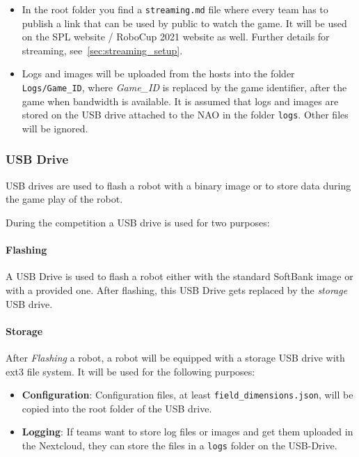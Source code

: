 \begin{itemize}
    \item In the root folder you find a \texttt{streaming.md} file where every team has to publish a link that can be used by public to watch the game. It will be used on the SPL website / RoboCup 2021 website as well. Further details for streaming, see~\ref{sec:streaming_setup}.
	\item Logs and images will be uploaded from the hosts into the folder \texttt{Logs/Game\_ID}, where \textit{Game\_ID} is replaced by the game identifier, after the game when bandwidth is available. It is assumed that logs and images are stored on the USB drive attached to the NAO in the folder \texttt{logs}. Other files will be ignored. 

\end{itemize}

\subsubsection{USB Drive}
\label{sec:c3_USB_Drive}
USB drives are used to flash a robot with a binary image or to store data during the game play of the robot.

During the competition a USB drive is used for two purposes:

\paragraph*{Flashing}
A USB Drive is used to flash a robot either with the standard SoftBank image or with a provided one. After flashing, this USB Drive gets replaced by the \textit{storage} USB drive.

\paragraph*{Storage}
After \textit{Flashing} a robot, a robot will be equipped with a storage USB drive with ext3 file system. It will be used for the following purposes:

\begin{itemize}
	\item \textbf{Configuration}: Configuration files, at least \texttt{field\_dimensions.json}, will be copied into the root folder of the USB drive. 
	\item  \textbf{Logging}: If teams want to store log files or images and get them uploaded in the Nextcloud, they can store the files in a \texttt{logs} folder on the USB-Drive. 
\end{itemize}

